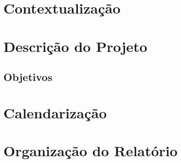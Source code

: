 
\section{Contextualização}
\label{sec:Ch1.1}

\lipsum[1] %


\section{Descrição do Projeto}
\label{sec:Ch1.2}

\lipsum[2]


\subsection{Objetivos}
\label{sub:Ch1.2.1}

\lipsum[2]


\section{Calendarização}
\label{sec:Ch1.3}

\lipsum[1]



\section{Organização do Relatório}
\label{sec:Ch1.4}

\lipsum[2]



